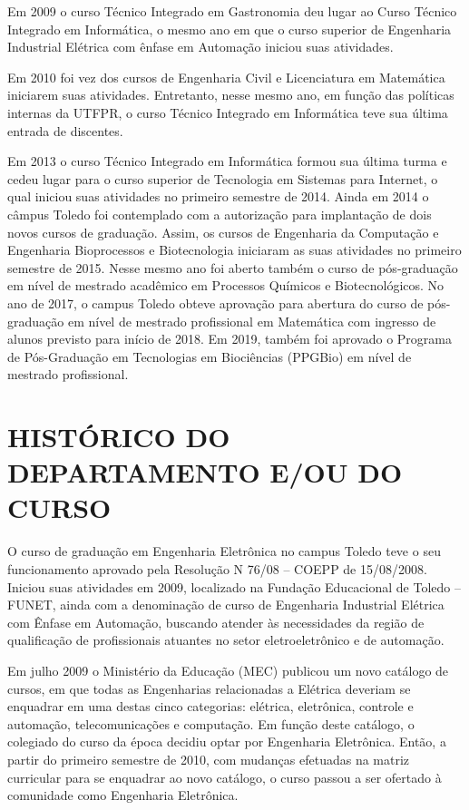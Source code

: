 Em 2009 o curso Técnico Integrado em Gastronomia deu lugar ao Curso Técnico Integrado em Informática, o mesmo ano em que o curso superior de Engenharia Industrial Elétrica com ênfase em Automação iniciou suas atividades.

Em 2010 foi vez dos cursos de Engenharia Civil e Licenciatura em Matemática iniciarem suas atividades. Entretanto, nesse mesmo ano, em função das políticas internas da UTFPR, o curso Técnico Integrado em Informática teve sua última entrada de discentes.

Em 2013 o curso Técnico Integrado em Informática formou sua última turma e cedeu lugar para o curso superior de Tecnologia em Sistemas para Internet, o qual iniciou suas atividades no primeiro semestre de 2014. Ainda em 2014 o câmpus Toledo foi contemplado com a autorização para implantação de dois novos cursos de graduação. Assim, os cursos de Engenharia da Computação e Engenharia Bioprocessos e Biotecnologia iniciaram as suas atividades no primeiro semestre de 2015. Nesse mesmo ano foi aberto também o curso de pós-graduação em nível de mestrado acadêmico em Processos Químicos e Biotecnológicos. No ano de 2017, o campus Toledo obteve aprovação para abertura do curso de pós-graduação em nível de mestrado profissional em Matemática com ingresso de alunos previsto para início de 2018. Em 2019, também foi aprovado o Programa de Pós-Graduação em Tecnologias em Biociências (PPGBio) em nível de mestrado profissional.


\section{HISTÓRICO DO DEPARTAMENTO E/OU DO CURSO}

O curso de graduação em Engenharia Eletrônica no campus Toledo teve o seu funcionamento aprovado pela Resolução N\textordmasculine{} 76/08 – COEPP de 15/08/2008. Iniciou suas atividades em 2009, localizado na Fundação Educacional de Toledo – FUNET, ainda com a denominação de curso de Engenharia Industrial Elétrica com Ênfase em Automação, buscando atender às necessidades da região de qualificação de profissionais atuantes no setor eletroeletrônico e de automação.


Em julho 2009 o Ministério da Educação (MEC) publicou um novo catálogo de cursos, em que todas as Engenharias relacionadas a Elétrica deveriam se enquadrar em uma destas cinco categorias: elétrica, eletrônica, controle e automação, telecomunicações e computação. Em função deste catálogo, o colegiado do curso da época decidiu optar por Engenharia Eletrônica. Então, a partir do primeiro semestre de 2010, com mudanças efetuadas na matriz curricular para se enquadrar ao novo catálogo, o curso passou a ser ofertado à comunidade como Engenharia Eletrônica.

